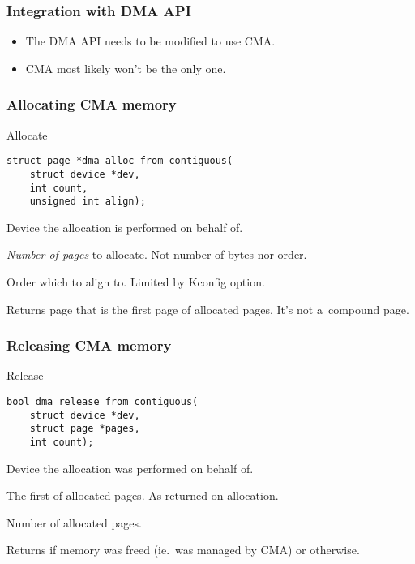 \begin{frame}
  \frametitle{Integration with DMA API}

  \begin{itemize}
  \item The DMA API needs to be modified to use CMA.
  \item CMA most likely won't be the only one.
  \end{itemize}
\end{frame}

\begin{frame}[fragile]
  \frametitle{Allocating CMA memory}

  \begin{block}{Allocate}
\begin{lstlisting}
struct page *dma_alloc_from_contiguous(
    struct device *dev,
    int count,
    unsigned int align);
\end{lstlisting}
  \end{block}

  \begin{description}[countAA]
  \item[{\ttfamily dev}] Device the allocation is performed on behalf
    of.
  \item[{\ttfamily count}] \emph{Number of pages} to
    allocate. {\footnotesize Not number of bytes nor order.}
  \item[{\ttfamily align}] Order which to align to.  Limited by
    Kconfig option.
  \item Returns page that is the first page of  allocated
    pages. {\footnotesize It's not a~compound page.}
  \end{description}
\end{frame}

\begin{frame}[fragile]
  \frametitle{Releasing CMA memory}

  \begin{block}{Release}
\begin{lstlisting}
bool dma_release_from_contiguous(
    struct device *dev,
    struct page *pages,
    int count);
\end{lstlisting}
  \end{block}

  \begin{description}[countAA]
  \item[{\ttfamily dev}] Device the allocation was performed on behalf
    of.
  \item[{\ttfamily pages}] The first of allocated
    pages. {\footnotesize As returned on allocation.}
  \item[{\ttfamily count}] Number of allocated pages.
  \item Returns  if memory was freed (ie.\ was managed by
    CMA) or  otherwise.
  \end{description}
\end{frame}


